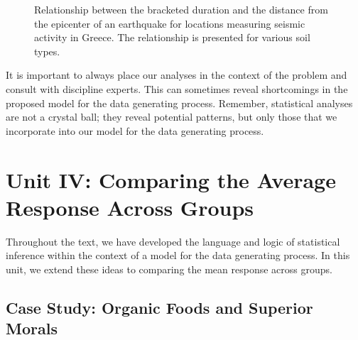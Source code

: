 \documentclass[
  letterpaper,
  DIV=11,
  numbers=noendperiod]{scrreprt}
\theoremstyle{plain}
\theoremstyle{definition}
\theoremstyle{definition}
\theoremstyle{remark}
\begin{document}
\begin{figure}


\caption{\label{fig-regrecap-multivariable}Relationship between the
bracketed duration and the distance from the epicenter of an earthquake
for locations measuring seismic activity in Greece. The relationship is
presented for various soil types.}

\end{figure}%

It is important to always place our analyses in the context of the
problem and consult with discipline experts. This can sometimes reveal
shortcomings in the proposed model for the data generating process.
Remember, statistical analyses are not a crystal ball; they reveal
potential patterns, but only those that we incorporate into our model
for the data generating process.

\part{Unit IV: Comparing the Average Response Across Groups}

Throughout the text, we have developed the language and logic of
statistical inference within the context of a model for the data
generating process. In this unit, we extend these ideas to comparing the
mean response across groups.

\chapter{Case Study: Organic Foods and Superior
Morals}\label{sec-caseorganic}
\end{document}

